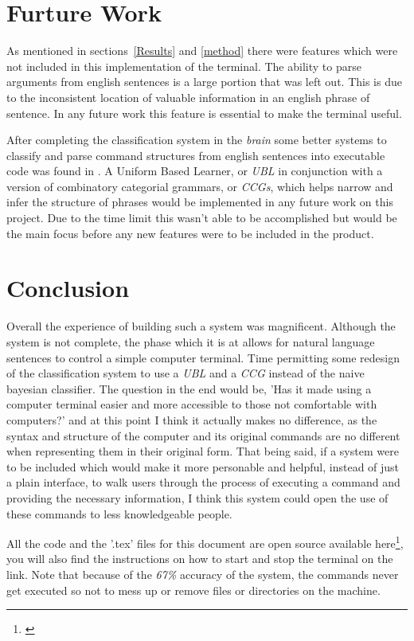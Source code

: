 \documentclass[12pt]{article}
\begin{document}
\section{Furture Work}

As mentioned in sections~\ref{Results} and \ref{method} there were features which were not included in this implementation of the terminal. The ability to parse arguments from english sentences is a large portion that was left out. This is due to the inconsistent location of valuable information in an english phrase of sentence. In any future work this feature is essential to make the terminal useful.

After completing the classification system in the {\it brain} some better systems to classify and parse command structures from english sentences into executable code was found in \cite{matuszek}. A Uniform Based Learner, or {\it UBL} in conjunction with a version of combinatory categorial grammars, or {\it CCGs}, which helps narrow and infer the structure of phrases would be implemented in any future work on this project. Due to the time limit this wasn't able to be accomplished but would be the main focus before any new features were to be included in the product.

\section{Conclusion}

Overall the experience of building such a system was magnificent. Although the system is not complete, the phase which it is at allows for natural language sentences to control a simple computer terminal. Time permitting some redesign of the classification system to use a {\it UBL} and a {\it CCG} instead of the naive bayesian classifier. The question in the end would be, 'Has it made using a computer terminal easier and more accessible to those not comfortable with computers?' and at this point I think it actually makes no difference, as the syntax and structure of the computer and its original commands are no different when representing them in their original form. That being said, if a system were to be included which would make it more personable and helpful, instead of just a plain interface, to walk users through the process of executing a command and providing the necessary information, I think this system could open the use of these commands to less knowledgeable people.

All the code and the '.tex' files for this document are open source available here\footnote{\url{}}, you will also find the instructions on how to start and stop the terminal on the link. Note that because of the {\it 67\%} accuracy of the system, the commands never get executed so not to mess up or remove files or directories on the machine.



\end{document}

